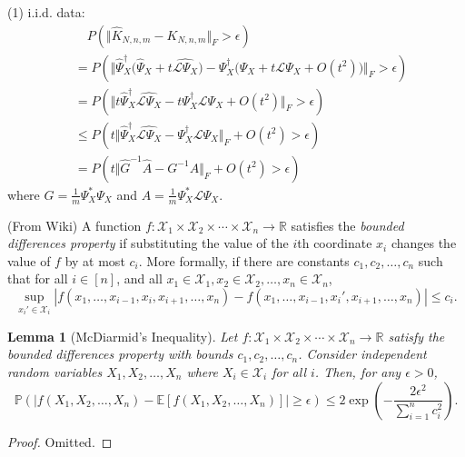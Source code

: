 \documentclass{article}[11]
\newtheorem{lemma}[theorem]{Lemma}
\begin{document}
(1) i.i.d. data:
\begin{align*}
	&\quad P\left(\Vert \widehat{K}_{N,n,m} - K_{N,n,m} \Vert_F > \epsilon \right) \\
	&= P\left(\Vert \widehat{\Psi}_X^{\dagger}\big(\widehat{\Psi}_X + t \widehat{\mathcal{L}\Psi_X} \big) - \Psi_X^{\dagger}\big(\Psi_X + t\mathcal{L}\Psi_{X} + O(t^2) \big) \Vert_F > \epsilon \right) \\
	&= P\left(\Vert t\widehat{\Psi}_X^{\dagger} \widehat{\mathcal{L}\Psi_X} - t\Psi_X^{\dagger}\mathcal{L}\Psi_{X} + O(t^2) \Vert_F > \epsilon \right) \\
	&\leq P\left( t\Vert \widehat{\Psi}_X^{\dagger} \widehat{\mathcal{L}\Psi_X} - \Psi_X^{\dagger}\mathcal{L}\Psi_{X} \Vert_F + O(t^2) > \epsilon \right) \\
	&= P\left( t\Vert \widehat{G}^{-1} \widehat{A} - G^{-1}A \Vert_F + O(t^2) > \epsilon \right)
\end{align*}
where $G = \frac{1}{m}\Psi_X^* \Psi_X$ and $A = \frac{1}{m}\Psi_X^* \mathcal{L}\Psi_{X}$.

(From Wiki) A function $f : \mathcal{X}_1 \times \mathcal{X}_2 \times \cdots \times \mathcal{X}_n \to \mathbb{R}$ satisfies the \textit{bounded differences property} if substituting the value of the $i$th coordinate $x_i$ changes the value of $f$ by at most $c_i$. More formally, if there are constants $c_1, c_2, \ldots, c_n$ such that for all $i \in [n]$, and all $x_1 \in \mathcal{X}_1, x_2 \in \mathcal{X}_2, \ldots, x_n \in \mathcal{X}_n$,
\[
\sup_{x_i' \in \mathcal{X}_i} |f(x_1, \ldots, x_{i-1}, x_i, x_{i+1}, \ldots, x_n) - f(x_1, \ldots, x_{i-1}, x_i', x_{i+1}, \ldots, x_n)| \leq c_i.
\]


\begin{lemma}[McDiarmid's Inequality]\label{McDiarmid}
	Let $f : \mathcal{X}_1 \times \mathcal{X}_2 \times \cdots \times \mathcal{X}_n \to \mathbb{R}$ satisfy the bounded differences property with bounds $c_1, c_2, \ldots, c_n$. Consider independent random variables $X_1, X_2, \ldots, X_n$ where $X_i \in \mathcal{X}_i$ for all $i$. Then, for any $\epsilon > 0$,
	\[
	\mathbb{P}(|f(X_1, X_2, \ldots, X_n) - \mathbb{E}[f(X_1, X_2, \ldots, X_n)]| \geq \epsilon) \leq 2 \exp\left( - \frac{2\epsilon^2}{\sum_{i=1}^n c_i^2} \right).
	\]
\end{lemma}
\begin{proof}
	Omitted.
\end{proof}
\end{document}
